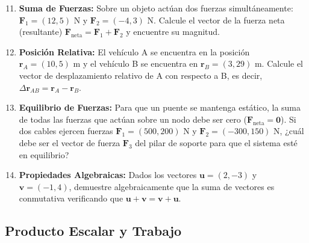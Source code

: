 \documentclass[11pt,a4paper]{book}
\begin{document}
\begin{enumerate}
    \setcounter{enumi}{10}
    \item \textbf{Suma de Fuerzas:} Sobre un objeto actúan dos fuerzas simultáneamente: $\boldsymbol{F}_1 = (12, 5) \text{ N}$ y $\boldsymbol{F}_2 = (-4, 3) \text{ N}$. Calcule el vector de la fuerza neta (resultante) $\boldsymbol{F}_{\text{neta}} = \boldsymbol{F}_1 + \boldsymbol{F}_2$ y encuentre su magnitud.
    
    \item \textbf{Posición Relativa:} El vehículo A se encuentra en la posición $\boldsymbol{r}_A = (10, 5) \text{ m}$ y el vehículo B se encuentra en $\boldsymbol{r}_B = (3, 29) \text{ m}$. Calcule el vector de desplazamiento relativo de A con respecto a B, es decir, $\Delta\boldsymbol{r}_{AB} = \boldsymbol{r}_A - \boldsymbol{r}_B$.
    
    \item \textbf{Equilibrio de Fuerzas:} Para que un puente se mantenga estático, la suma de todas las fuerzas que actúan sobre un nodo debe ser cero ($\boldsymbol{F}_{\text{neta}} = \boldsymbol{0}$). Si dos cables ejercen fuerzas $\boldsymbol{F}_1 = (500, 200) \text{ N}$ y $\boldsymbol{F}_2 = (-300, 150) \text{ N}$, ¿cuál debe ser el vector de fuerza $\boldsymbol{F}_3$ del pilar de soporte para que el sistema esté en equilibrio?
    
    \item \textbf{Propiedades Algebraicas:} Dados los vectores $\boldsymbol{u} = (2, -3)$ y $\boldsymbol{v} = (-1, 4)$, demuestre algebraicamente que la suma de vectores es conmutativa verificando que $\boldsymbol{u} + \boldsymbol{v} = \boldsymbol{v} + \boldsymbol{u}$.
\end{enumerate}

\subsection*{Producto Escalar y Trabajo}
\end{document}
